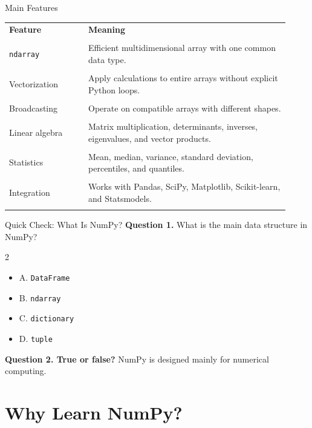 \documentclass[aspectratio=169,11pt]{beamer}
\newcommand{\quiztitle}[1]{\textbf{\textcolor{QuizOrange}{#1}}}
\begin{document}
\begin{frame}{Main Features}
\scriptsize
\begin{tabular}{p{0.26\linewidth}p{0.66\linewidth}}
\toprule
\textbf{Feature} & \textbf{Meaning} \\\\
\midrule
\texttt{ndarray} & Efficient multidimensional array with one common data type. \\\\
Vectorization & Apply calculations to entire arrays without explicit Python loops. \\\\
Broadcasting & Operate on compatible arrays with different shapes. \\\\
Linear algebra & Matrix multiplication, determinants, inverses, eigenvalues, and vector products. \\\\
Statistics & Mean, median, variance, standard deviation, percentiles, and quantiles. \\\\
Integration & Works with Pandas, SciPy, Matplotlib, Scikit-learn, and Statsmodels. \\\\
\bottomrule
\end{tabular}
\end{frame}

\begin{frame}{Quick Check: What Is NumPy?}
\small
\quiztitle{Question 1.} What is the main data structure in NumPy?
\begin{multicols}{2}
\begin{itemize}
  \item A. \texttt{DataFrame}
  \item B. \texttt{ndarray}
  \item C. \texttt{dictionary}
  \item D. \texttt{tuple}
\end{itemize}
\end{multicols}
\vspace{0.8em}
\quiztitle{Question 2. True or false?} NumPy is designed mainly for numerical computing.
\end{frame}

\section{Why Learn NumPy?}
\end{document}
